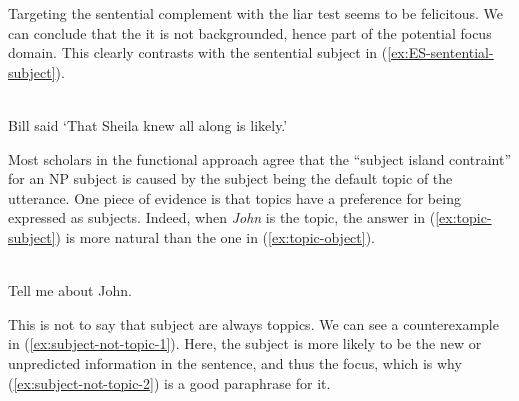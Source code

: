Targeting the sentential complement with the liar test seems to be felicitous. We can conclude that the it is not backgrounded, hence part of the potential focus domain. This clearly contrasts with the sentential subject in (\ref{ex:ES-sentential-subject}).

\begin{exe}
\ex \citep[157]{Erteschik-Shir.1973}\\
Bill said `That Sheila knew all along is likely.'
\label{ex:ES-sentential-subject}
\begin{xlist}
\end{xlist}
\end{exe}

Most scholars in the functional approach agree that the ``subject island contraint'' for an NP subject is caused by the subject being the default topic of the utterance. One piece of evidence is that topics have a preference for being expressed as subjects. Indeed, when \emph{John} is the topic, the answer in (\ref{ex:topic-subject}) is more natural than the one in (\ref{ex:topic-object}). 

\begin{exe} 
\ex \citep[323]{Erteschik-Shir.2006}\\
Tell me about John.
\begin{xlist}
\end{xlist}
\end{exe}



This is not to say that subject are always toppics. We can see a counterexample in (\ref{ex:subject-not-topic-1}). Here, the subject is more likely to be the new or unpredicted information in the sentence, and thus the focus, which is why (\ref{ex:subject-not-topic-2}) is a good paraphrase for it. 

\begin{exe}
\ex \citep{Kuno.1987}
\label{ex:subject-not-topic}
\begin{xlist}
\end{xlist}
\end{exe}


